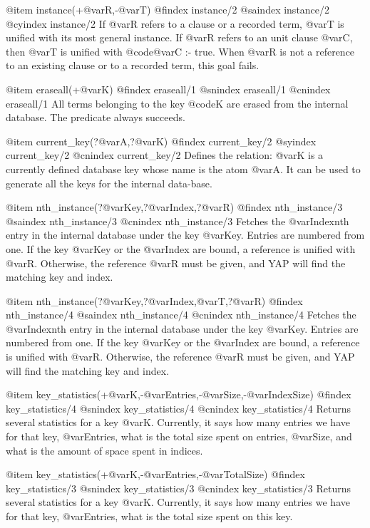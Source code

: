 {{{{{{@item instance(+@var{R},-@var{T})
@findex instance/2
@saindex instance/2
@cyindex instance/2
If @var{R} refers to a clause or a recorded term, @var{T} is unified
with its most general instance. If @var{R} refers to an unit clause
@var{C}, then @var{T} is unified with @code{@var{C} :- true}. When
@var{R} is not a reference to an existing clause or to a recorded term,
this goal fails.

@item eraseall(+@var{K})
@findex eraseall/1
@snindex eraseall/1
@cnindex eraseall/1
All terms belonging to the key @code{K} are erased from the internal
database. The predicate always succeeds.

@item current_key(?@var{A},?@var{K})
@findex current_key/2
@syindex current_key/2
@cnindex current_key/2
Defines the relation: @var{K} is a currently defined database key whose
name is the atom @var{A}. It can be used to generate all the keys for
the internal data-base.

@item nth_instance(?@var{Key},?@var{Index},?@var{R})
@findex nth_instance/3
@saindex nth_instance/3
@cnindex nth_instance/3
Fetches the @var{Index}nth entry in the internal database under the key
@var{Key}. Entries are numbered from one. If the key @var{Key} or the
@var{Index} are bound, a reference is unified with @var{R}. Otherwise,
the reference @var{R} must be given, and YAP will find
the matching key and index.


@item nth_instance(?@var{Key},?@var{Index},@var{T},?@var{R})
@findex nth_instance/4
@saindex nth_instance/4
@cnindex nth_instance/4
Fetches the @var{Index}nth entry in the internal database under the key
@var{Key}. Entries are numbered from one. If the key @var{Key} or the
@var{Index} are bound, a reference is unified with @var{R}. Otherwise,
the reference @var{R} must be given, and YAP will find
the matching key and index.

@item key_statistics(+@var{K},-@var{Entries},-@var{Size},-@var{IndexSize})
@findex key_statistics/4
@snindex key_statistics/4
@cnindex key_statistics/4
Returns several statistics for a key @var{K}. Currently, it says how
many entries we have for that key, @var{Entries}, what is the
total size spent on entries, @var{Size}, and what is the amount of
space spent in indices.

@item key_statistics(+@var{K},-@var{Entries},-@var{TotalSize})
@findex key_statistics/3
@snindex key_statistics/3
@cnindex key_statistics/3
Returns several statistics for a key @var{K}. Currently, it says how
many entries we have for that key, @var{Entries}, what is the
total size spent on this key.

}}}}}}

